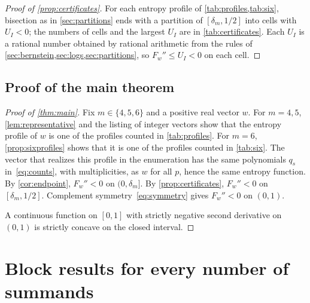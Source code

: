 \documentclass[11pt,a4paper]{article}
\numberwithin{equation}{section}
\theoremstyle{remark}
\begin{document}
\begin{proof}[Proof of \cref{prop:certificates}]
For each entropy profile of \cref{tab:profiles,tab:six}, bisection as in \cref{sec:partitions} ends with a partition of $[\delta_m,1/2]$ into cells with $U_I<0$; the numbers of cells and the largest $U_I$ are in \cref{tab:certificates}. Each $U_I$ is a rational number obtained by rational arithmetic from the rules of \cref{sec:bernstein,sec:logs,sec:partitions}, so $F_w''\le U_I<0$ on each cell.
\end{proof}

\subsection{Proof of the main theorem}\label{sec:proof}

\begin{proof}[Proof of \cref{thm:main}]
Fix $m\in\{4,5,6\}$ and a positive real vector $w$. For $m=4,5$, \cref{lem:representative} and the listing of integer vectors show that the entropy profile of $w$ is one of the profiles counted in \cref{tab:profiles}. For $m=6$, \cref{prop:sixprofiles} shows that it is one of the profiles counted in \cref{tab:six}. The vector that realizes this profile in the enumeration has the same polynomials $q_s$ in~\eqref{eq:counts}, with multiplicities, as $w$ for all $p$, hence the same entropy function.
By \cref{cor:endpoint}, $F_w''<0$ on $(0,\delta_m]$. By \cref{prop:certificates}, $F_w''<0$ on $[\delta_m,1/2]$. Complement symmetry~\eqref{eq:symmetry} gives $F_w''<0$ on $(0,1)$.

A continuous function on $[0,1]$ with strictly negative second derivative on $(0,1)$ is strictly concave on the closed interval.
\end{proof}

\section{Block results for every number of summands}\label{sec:allm}
\end{document}
